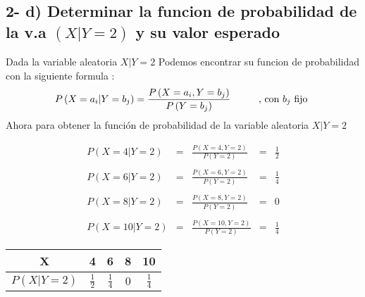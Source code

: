 \documentclass[12pt]{article}
\begin{document}
\subsection*{2- d) Determinar la funcion de probabilidad de la v.a $\left(X|Y = 2\right)$ y su valor esperado }

\begin{flushleft}
    Dada la variable aleatoria $ X | Y = 2 $ Podemos encontrar su funcion de probabilidad con la siguiente formula :
    \begin{equation*}
        P \left(X = a_i | Y = b_j\right) = \frac{P\left(X = a_i , Y = b_j\right)}{P \left(Y = b_j\right)}
        \hspace*{1cm}
        \mbox{, con $b_j$  fijo }
    \end{equation*}
    Ahora para obtener la funci\'on de probabilidad de la variable aleatoria $ X|Y =2$
\end{flushleft}

\begin{equation*}
    \begin{array}{rcccc}
        P\left(X = 4 | Y =2 \right)  & = & \displaystyle \frac{P\left(X=4 , Y=2\right)}{P\left(Y =2\right)}  & = & \displaystyle \frac{1}{2}
        \\
        \\
        P\left(X = 6 | Y =2 \right)  & = & \displaystyle \frac{P\left(X=6 , Y=2\right)}{P\left(Y =2\right)}  & = & \displaystyle \frac{1}{4}
        \\
        \\
        P\left(X = 8 | Y =2 \right)  & = & \displaystyle \frac{P\left(X=8 , Y=2\right)}{P\left(Y =2\right)}  & = & 0
        \\
        \\
        P\left(X = 10 | Y =2 \right) & = & \displaystyle \frac{P\left(X=10 , Y=2\right)}{P\left(Y =2\right)} & = & \displaystyle \frac{1}{4}
    \end{array}
\end{equation*}


\begin{center}
    \renewcommand{\arraystretch}{1.5}
    \begin{tabular}{|c|c|c|c|c|}
        \hline
        X                                    & 4              & 6              & 8   & 10
        \\
        \hline
        $\displaystyle P \left(X|Y=2\right)$ & $ \frac{1}{2}$ & $ \frac{1}{4}$ & $0$ & $ \frac{1}{4}$
        \\
        \hline
    \end{tabular}
\end{center}
\end{document}

